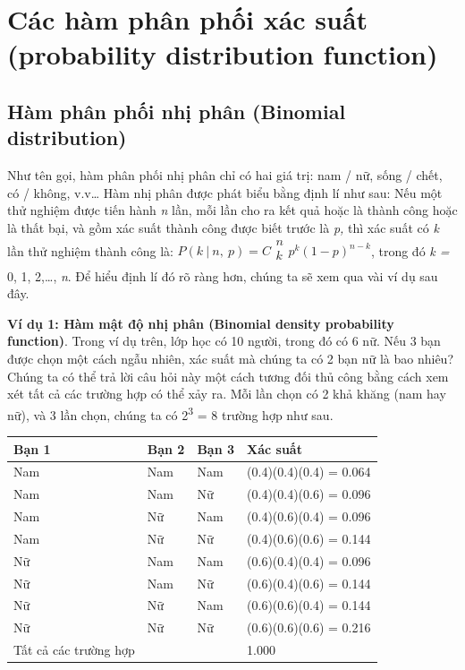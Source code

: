 \documentclass[
]{book}
\begin{document}
\hypertarget{cuxe1c-huxe0m-phuxe2n-phux1ed1i-xuxe1c-suux1ea5t-probability-distribution-function}{%
\section{Các hàm phân phối xác suất (probability distribution function)}\label{cuxe1c-huxe0m-phuxe2n-phux1ed1i-xuxe1c-suux1ea5t-probability-distribution-function}}

\hypertarget{huxe0m-phuxe2n-phux1ed1i-nhux1ecb-phuxe2n-binomial-distribution}{%
\subsection{Hàm phân phối nhị phân (Binomial distribution)}\label{huxe0m-phuxe2n-phux1ed1i-nhux1ecb-phuxe2n-binomial-distribution}}

Như tên gọi, hàm phân phối nhị phân chỉ có hai giá trị: nam / nữ, sống / chết, có / không, v.v\ldots{} Hàm nhị phân được phát biểu bằng định lí như sau: Nếu một thử nghiệm được tiến hành \emph{n} lần, mỗi lần cho ra kết quả hoặc là thành công hoặc là thất bại, và gồm xác suất thành công được biết trước là \emph{p,} thì xác suất có \emph{k} lần thử nghiệm thành công là:
\(P\left( k\ |\ n,\ p \right) = C\begin{matrix} n \\ k \\ \end{matrix}p^{k}\left( 1 - p \right)^{n - k}\), trong đó \emph{k =} 0, 1, 2,\ldots, \emph{n}. Để hiểu định lí đó rõ ràng hơn, chúng ta sẽ xem qua vài ví dụ sau đây.

\textbf{Ví dụ 1: Hàm mật độ nhị phân (Binomial density probability function)}. Trong ví dụ trên, lớp học có 10 người, trong đó có 6 nữ. Nếu 3 bạn được chọn một cách ngẫu nhiên, xác suất mà chúng ta có 2 bạn nữ là bao nhiêu? Chúng ta có thể trả lời câu hỏi này một cách tương đối thủ công bằng cách xem xét tất cả các trường hợp có thể xảy ra. Mỗi lần chọn có 2 khả khăng (nam hay nữ), và 3 lần chọn, chúng ta có 2\textsuperscript{3} = 8 trường hợp như sau.

\begin{longtable}[]{@{}llll@{}}
\toprule
\textbf{Bạn 1} & \textbf{Bạn 2} & \textbf{Bạn 3} & \textbf{Xác suất}\tabularnewline
\midrule
\endhead
Nam & Nam & Nam & (0.4)(0.4)(0.4) = 0.064\tabularnewline
Nam & Nam & Nữ & (0.4)(0.4)(0.6) = 0.096\tabularnewline
Nam & Nữ & Nam & (0.4)(0.6)(0.4) = 0.096\tabularnewline
Nam & Nữ & Nữ & (0.4)(0.6)(0.6) = 0.144\tabularnewline
Nữ & Nam & Nam & (0.6)(0.4)(0.4) = 0.096\tabularnewline
Nữ & Nam & Nữ & (0.6)(0.4)(0.6) = 0.144\tabularnewline
Nữ & Nữ & Nam & (0.6)(0.6)(0.4) = 0.144\tabularnewline
Nữ & Nữ & Nữ & (0.6)(0.6)(0.6) = 0.216\tabularnewline
Tất cả các trường hợp & & & 1.000\tabularnewline
\bottomrule
\end{longtable}
\end{document}
